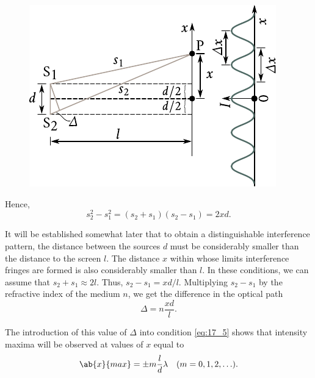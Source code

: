 \begin{figure}[!htb]
	\begin{center}
		\includegraphics[scale=0.95]{figures/ch_17/fig_17_2.pdf}
		\caption[]{}
		\label{fig:17_2}
	\end{center}
	\vspace{-0.9cm}
\end{figure}

\noindent
Hence,
\begin{equation*}
    s_2^2 - s_1^2 = (s_2 + s_1) (s_2 - s_1) = 2xd.
\end{equation*}

It will be established somewhat later that to obtain a distinguishable interference pattern, the distance between the sources $d$ must be considerably smaller than the distance to the screen $l$.
The distance $x$ within whose limits interference fringes are formed is also considerably smaller than $l$.
In these conditions, we can assume that $s_2+s_1 \approx 2l$.
Thus, $s_2-s_1=xd/l$.
Multiplying $s_2-s_1$ by the refractive index of the medium $n$, we get the difference in the optical path
\begin{equation}\label{eq:17_7}
    \Delta = n \frac{xd}{l}.
\end{equation}

\noindent
The introduction of this value of $\Delta$ into condition \eqref{eq:17_5} shows that intensity maxima will be observed at values of $x$ equal to
\begin{equation}\label{eq:17_8}
    \ab{x}{max} = \pm m \frac{l}{d} \lambda \quad (m = 0, 1, 2, \ldots).
\end{equation}

